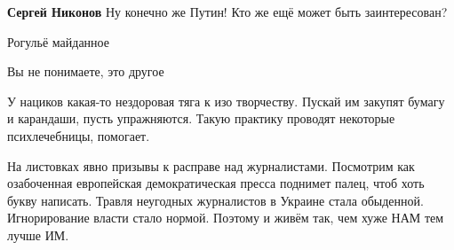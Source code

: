 \begin{itemize}
\begin{itemize}
 
\textbf{Сергей Никонов} Ну конечно же Путин! Кто же ещё может быть заинтересован?
\end{itemize}

 
Рогульё майданное

 
Вы не понимаете, это другое

 

У нациков какая-то нездоровая тяга к изо творчеству. Пускай им закупят бумагу и
карандаши, пусть упражняются. Такую практику проводят некоторые
психлечебницы, помогает.


 

На листовках явно призывы к расправе над журналистами. Посмотрим как
озабоченная европейская демократическая пресса поднимет палец, чтоб хоть букву
написать. Травля неугодных журналистов в Украине стала обыденной. Игнорирование
власти стало нормой. Поэтому и живём так, чем хуже НАМ тем лучше ИМ.

 

\end{itemize}
